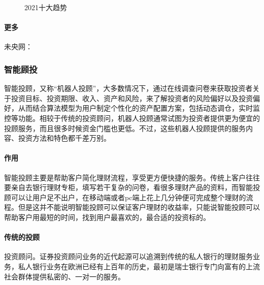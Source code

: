 \documentclass[letterpaper,11pt,english]{sphinxmanual}
\begin{document}
\begin{center}
{{\begin{figure}[H]
\noindent{}
\caption{2021十大趋势}\label{\detokenize{chapter_AI+Finance/FinTech:id18}}\end{figure}


\paragraph{更多}
\label{\detokenize{chapter_AI+Finance/FinTech:id16}}
未央网：


\subsubsection{智能顾投}
\label{\detokenize{chapter_AI+Finance/Robo-Advisor:id1}}\label{\detokenize{chapter_AI+Finance/Robo-Advisor::doc}}
智能投顾，又称“机器人投顾”，大多数情况下，通过在线调查问卷来获取投资者关于投资目标、投资期限、收入、资产和风险，来了解投资者的风险偏好以及投资偏好，从而结合算法模型为用户制定个性化的资产配置方案，包括动态调仓，实时监控等功能。相较于传统的投资顾问，机器人投顾通常试图为投资者提供更为便宜的投顾服务，而且很多时候资金门槛也更低。不过，这些机器人投顾提供的服务内容、投资方法和特色都千差万别。
%
\begin{footnote}[956]\sphinxAtStartFootnote
{}
%
\end{footnote}


\paragraph{作用}
\label{\detokenize{chapter_AI+Finance/Robo-Advisor:id2}}
智能投顾主要是帮助客户简化理财流程，享受更方便快捷的服务。传统上客户往往要亲自去银行理财专柜，填写若干复杂的问卷，看很多理财产品的资料，而智能投顾可以让用户足不出户，在移动端或者pc端上花上几分钟便可完成整个理财的流程。但是这并不能说明智能投顾可以保证客户理财的收益率，只能说智能投顾可以帮助客户用最短的时间，找到用户最喜欢的，最合适的投资标的。


\paragraph{传统的投顾}
\label{\detokenize{chapter_AI+Finance/Robo-Advisor:id3}}
投资顾问。证券投资顾问业务的近代起源可以追溯到传统的私人银行的理财服务业务，私人银行业务在欧洲已经有上百年的历史，最初是瑞士银行专门向富有的上流社会群体提供私密的、一对一的服务。%
\begin{footnote}[957]\sphinxAtStartFootnote
{}
%
\end{footnote}


}}
\end{center}
\end{document}
